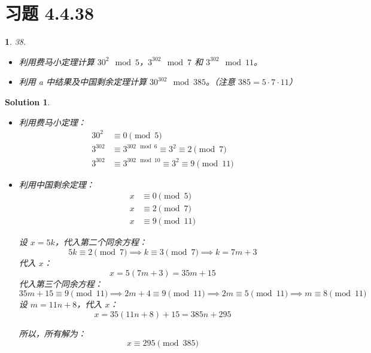 \documentclass[UTF8]{report}
\newtheorem{solution}{Solution}
\theoremstyle{MyLineTheoremStyle} %
\theoremstyle{MyBlockTheoremStyle} %
\theoremstyle{MySubsubsectionStyle} %
\newtheorem{definition}{}
\begin{document}
\section{习题 4.4.38}

\begin{definition}
    38. 
    \begin{itemize}
        \item[a)] 利用费马小定理计算 \( 30^{2} \mod 5 \)，\( 3^{302} \mod 7 \) 和 \( 3^{302} \mod 11 \)。
        \item[b)] 利用 a 中结果及中国剩余定理计算 \( 30^{302} \mod 385 \)。（注意 \( 385 = 5 \cdot 7 \cdot 11 \)）
    \end{itemize}
\end{definition}

\begin{solution}
    \begin{itemize}
        \item[a)] 利用费马小定理：
        \[
        \begin{aligned}
            30^{2} &\equiv 0 \pmod{5} \\
            3^{302} &\equiv 3^{302 \mod 6} \equiv 3^2 \equiv 2 \pmod{7} \\
            3^{302} &\equiv 3^{302 \mod 10} \equiv 3^2 \equiv 9 \pmod{11}
        \end{aligned}
        \]

        \item[b)] 利用中国剩余定理：
        \[
        \begin{aligned}
            x &\equiv 0 \pmod{5} \\
            x &\equiv 2 \pmod{7} \\
            x &\equiv 9 \pmod{11}
        \end{aligned}
        \]

        设 \( x = 5k \)，代入第二个同余方程：
        \[
        5k \equiv 2 \pmod{7} \implies k \equiv 3 \pmod{7} \implies k = 7m + 3
        \]
        代入 \( x \)：
        \[
        x = 5(7m + 3) = 35m + 15
        \]
        代入第三个同余方程：
        \[
        35m + 15 \equiv 9 \pmod{11} \implies 2m + 4 \equiv 9 \pmod{11} \implies 2m \equiv 5 \pmod{11} \implies m \equiv 8 \pmod{11}
        \]
        设 \( m = 11n + 8 \)，代入 \( x \)：
        \[
        x = 35(11n + 8) + 15 = 385n + 295
        \]

        所以，所有解为：
        \[
        x \equiv 295 \pmod{385}
        \]
    \end{itemize}
\end{solution}
\end{document}
